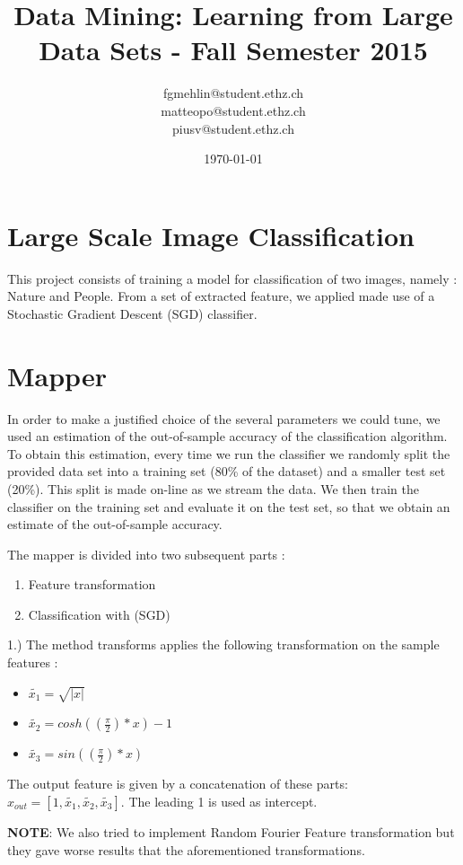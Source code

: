 \documentclass[a4paper, 11pt]{article}
\title{Data Mining: Learning from Large Data Sets - Fall Semester 2015}
\author{fgmehlin@student.ethz.ch\\ matteopo@student.ethz.ch\\ piusv@student.ethz.ch\\}
\date{\today}
\begin{document}
\maketitle

\section*{Large Scale Image Classification} 
This project consists of training a model for classification of two images, namely : Nature and People. From a set of extracted feature, we applied made use of a Stochastic Gradient Descent (SGD) classifier.
\section{Mapper}

In order to make a justified choice of the several parameters we could tune, we used an estimation of the out-of-sample accuracy of the classification algorithm. To obtain this estimation, every time we run the classifier we randomly split the provided data set into a training set (80\% of the dataset) and a smaller test set (20\%). This split is made on-line as we stream the data. We then train the classifier on the training set and evaluate it on the test set, so that we obtain an estimate of the out-of-sample accuracy.

The mapper is divided into two subsequent parts :
\begin{enumerate}
\item Feature transformation
\item Classification with (SGD)
\end{enumerate}

1.) The method transforms applies the following transformation on the sample features :
\begin{itemize}
\item $\widetilde{x_1} = \sqrt{|x|}$
\item $\widetilde{x_2} = cosh((\frac{\pi}{2})*x) - 1$
\item $\widetilde{x_3} = sin((\frac{\pi}{2})*x)$
\end{itemize}
The output feature is given by a concatenation of these parts: $x_{out} = [1, \widetilde{x_1}, \widetilde{x_2}, \widetilde{x_3}]$. The leading 1 is used as intercept.

\textbf{NOTE}: We also tried to implement Random Fourier Feature transformation but they gave worse results that the aforementioned transformations.
\end{document}
